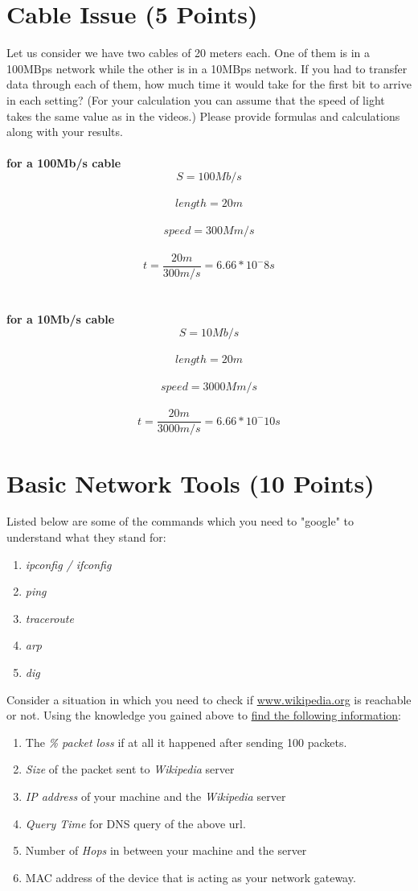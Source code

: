\documentclass{WeSTassignment}
\begin{document}

\section{Cable Issue (5 Points)}

Let us consider we have two cables of 20 meters each. One of them is in a 100MBps network while the other is in a 10MBps network. If you had to transfer data through each of them, how much time it would take for the first bit to arrive in each setting? (For your calculation you can assume that the speed of light takes the same value as in the videos.) Please provide formulas and calculations along with your results. \\
\\ \textbf{for a 100Mb/s cable}
\[S  = 100M b/s\] \\
\[length = 20 m\] \\
\[speed  = 300M m/s\] \\
\[t  = \frac{20m}{300 m/s} = 6.66*10^-8 s\] \\
\\ \textbf{for a 10Mb/s cable}
\[S  = 10M b/s\] \\
\[length = 20 m\] \\
\[speed  = 3000M m/s\] \\
\[t  = \frac{20m}{3000 m/s} = 6.66*10^-10 s\]


\section{Basic Network Tools (10 Points)}

Listed below are some of the commands which you need to "google" to understand what they stand for:
\begin{enumerate}
\item \emph{ipconfig / ifconfig}
\item \emph{ping}
\item \emph{traceroute}
\item \emph{arp}
\item \emph{dig}
\end{enumerate}

Consider a situation in which you need to check if \url{www.wikipedia.org} is reachable or not. Using the knowledge you gained above to \underline{find the following information}:
\begin{enumerate}
\itemsep0em
\item The \emph{\% packet loss} if at all it happened after sending 100 packets. 
\item \emph{Size} of the packet sent to \emph{Wikipedia} server
\item \emph{IP address} of your machine and the \emph{Wikipedia} server
\item \emph{Query Time} for DNS query of the above url.
\item Number of \emph{Hops} in between your machine and the server
\item MAC address of the device that is acting as your network gateway. 
\end{enumerate}
\end{document}
